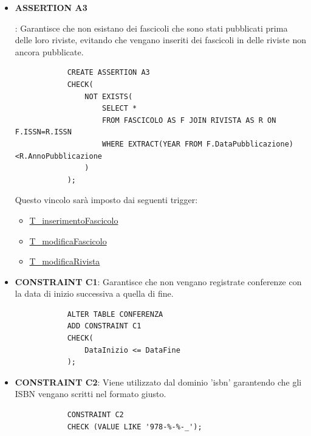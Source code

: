 \documentclass{article}
\begin{document}
\begin{itemize}
    \item \hypertarget{assertion3}{\textbf{ASSERTION A3}}: Garantisce che non esistano dei fascicoli che sono stati pubblicati prima delle loro riviste, evitando che vengano inseriti dei fascicoli in delle riviste non ancora pubblicate.
        \begin{verbatim}
            CREATE ASSERTION A3
            CHECK(
                NOT EXISTS(
                    SELECT *
                    FROM FASCICOLO AS F JOIN RIVISTA AS R ON F.ISSN=R.ISSN
                    WHERE EXTRACT(YEAR FROM F.DataPubblicazione)<R.AnnoPubblicazione  
                )
            );
        \end{verbatim}
    Questo vincolo sarà imposto dai seguenti trigger:
        \begin{itemize}
            \item \hyperlink{t7}{T\_inserimentoFascicolo}
            \item \hyperlink{t6}{T\_modificaFascicolo}
            \item \hyperlink{t9}{T\_modificaRivista}
        \end{itemize}    

    \item \textbf{CONSTRAINT C1}: Garantisce che non vengano registrate conferenze con la data di inizio successiva a quella di fine.
        \begin{verbatim}
            ALTER TABLE CONFERENZA
            ADD CONSTRAINT C1
            CHECK(
                DataInizio <= DataFine
            );
        \end{verbatim}
        
    \item \textbf{CONSTRAINT C2}: Viene utilizzato dal dominio 'isbn' garantendo che gli ISBN vengano scritti nel formato giusto.
        \begin{verbatim}
            CONSTRAINT C2
            CHECK (VALUE LIKE '978-%-%-_');
        \end{verbatim}
    

\end{itemize}
\end{document}
